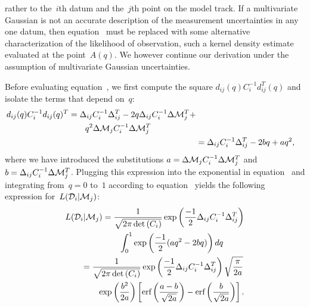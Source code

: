\documentclass[foo.tex]{subfiles}
\begin{document}
rather to the~$i$th datum and the~$j$th point on the model track.
If a multivariate Gaussian is not an accurate description of the measurement
uncertainties in any one datum, then equation~ must
be replaced with some alternative characterization of the likelihood of
observation, such a kernel density estimate evaluated at the point~$A(q)$.
We however continue our derivation under the assumption of multivariate
Gaussian uncertainties.
\par
Before evaluating equation~, we first compute the square
$d_{ij}(q)C_i^{-1}d_{ij}^T(q)$ and isolate the terms that depend on~$q$:
\begin{subequations}\begin{align}
\begin{split}
d_{ij}(q) C_i^{-1} d_{ij}(q)^T &= \Delta_{ij} C_i^{-1} \Delta_{ij}^T -
2q\Delta_{ij}C_i^{-1}\Delta \mathcal{M}_j^T +
\\
&\qquad q^2\Delta \mathcal{M}_j C_i^{-1} \Delta \mathcal{M}_j^T
\end{split}
\label{eq:chisquared}
\\
&= \Delta_{ij} C_i^{-1} \Delta_{ij}^T - 2bq + aq^2,
\end{align}\end{subequations}
where we have introduced the substitutions
$a = \Delta\mathcal{M}_j C_i^{-1} \Delta\mathcal{M}_j^T$ and
$b = \Delta_{ij} C_i^{-1} \Delta\mathcal{M}_j^T$.
Plugging this expression into the exponential in equation~
and integrating from~$q = 0$ to~$1$ according to equation~
yields the following expression for~$L(\mathcal{D}_i | \mathcal{M}_j)$:
\begin{subequations}\begin{align}
\begin{split}
L(\mathcal{D}_i | \mathcal{M}_j) &= \frac{1}{\sqrt{2\pi \det{(C_i)}}}
\exp\left(\frac{-1}{2}\Delta_{ij} C_i^{-1} \Delta_{ij}^T\right)
\\
&\qquad \int_0^1 \exp\left(\frac{-1}{2}(aq^2 - 2bq)\right)dq
\end{split}
\\
\begin{split}
&= \frac{1}{\sqrt{2\pi\det{(C_i)}}}
\exp\left(\frac{-1}{2}\Delta_{ij}C_i^{-1}\Delta_{ij}^T\right)
\sqrt{\frac{\pi}{2a}}
\\
&\qquad \exp\left(\frac{b^2}{2a}\right)
\left[\text{erf}\left(\frac{a - b}{\sqrt{2a}}\right) - \text{erf}\left(\frac{b}{\sqrt{2a}}
\right)\right].
\end{split}
\end{align}\end{subequations}
\end{document}
